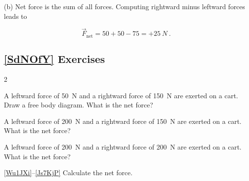 \documentclass{article}
\numberwithin{equation}{section}
\numberwithin{figure}{section}
\begin{document}
(b) Net force is the sum of all forces. Computing rightward minus leftward forces leads to
\vspace{-1em}

\begin{equation*}
    \vec{F}_{\text{net}} = 50 + 50 - 75 = +\SI{25}{N}\ .
\end{equation*}

\cyanhrule

\subsection*{\ref{SdNOfY} Exercises}

\begin{multicols}{2}
\begin{exercise} \label{RApeJt}
A leftward force of \SI{50}{N} and a rightward force of \SI{150}{N} are exerted on a cart. Draw a free body diagram. What is the net force?
\end{exercise}

\begin{exercise} \label{MUJe54}
A leftward force of \SI{200}{N} and a rightward force of \SI{150}{N} are exerted on a cart. What is the net force? 
\end{exercise}

\begin{exercise} \label{Uhrg0I}
A leftward force of \SI{200}{N} and a rightward force of \SI{200}{N} are exerted on a cart. What is the net force? 
\end{exercise}

\cyanhrule
\vspace{2ex}

\columnbreak

\ref{Wu1JXi}--\ref{Js7KjP} Calculate the net force.

\begin{exercise} \label{Wu1JXi}
\phantom{.}
\vspace{-2em}
\end{exercise}

\begin{center}
\end{center}



\end{multicols}
\end{document}
